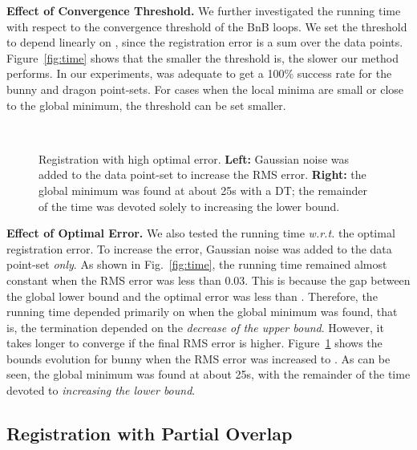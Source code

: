 \documentclass[10pt,journal,cspaper,compsoc]{IEEEtran}
\begin{document}
\vspace{0.05in}
\noindent\textbf{Effect of Convergence Threshold.} We further investigated the running time with respect to the convergence threshold of the BnB loops. We set the threshold  to depend linearly on , since the registration error is a sum over the  data points. Figure~\ref{fig:time} shows that the smaller the threshold is, the slower our method performs. In our experiments,  was adequate to get a 100\% success rate for the bunny and dragon point-sets. For cases when the local minima are small or close to the global minimum, the threshold can be set smaller.

\begin{figure}[!t]
\begin{center}
~~
\vspace{-5pt}
\caption{Registration with high optimal error. \textbf{Left:} Gaussian noise was added to the data point-set to increase the RMS error. \textbf{Right:} the global minimum was found at about 25s with a DT; the remainder of the time was devoted solely to increasing the lower bound.
\label{fig:time_error_eg}}
\end{center}
\vspace{-7pt}
\end{figure}

\vspace{0.05in}
\noindent\textbf{Effect of Optimal Error.} We also tested the running time \emph{w.r.t.} the optimal registration error. To increase the error, Gaussian noise was added to the data point-set \emph{only}. As shown in Fig.~\ref{fig:time}, the running time remained almost constant when the RMS error was less than 0.03. This is because the gap between the global lower bound and the optimal error was less than . Therefore, the running time depended primarily on when the global minimum was found, that is, the termination depended on the \emph{decrease of the upper bound}. However, it takes longer to converge if the final RMS error is higher. Figure~\ref{fig:time_error_eg} shows the bounds evolution for bunny when the RMS error was increased to . As can be seen, the global minimum was found at about 25s, with the remainder of the time devoted to \emph{increasing the lower bound}.

\subsection{Registration with Partial Overlap}\label{sec:outlierexp}
\end{document}
